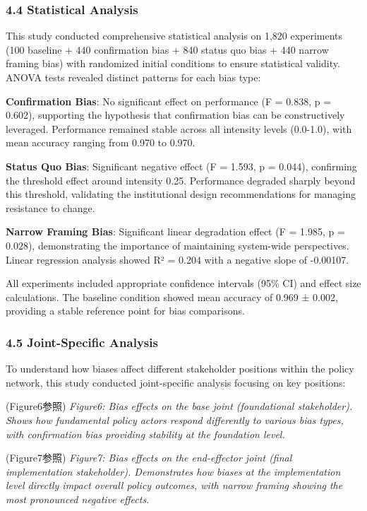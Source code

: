 \subsubsection{4.4 Statistical Analysis}\label{statistical-analysis}

This study conducted comprehensive statistical analysis on 1,820 experiments (100 baseline + 440 confirmation bias + 840 status quo bias + 440 narrow framing bias) with randomized initial conditions to ensure statistical validity. ANOVA tests revealed distinct patterns for each bias type:

\textbf{Confirmation Bias}: No significant effect on performance (F = 0.838, p = 0.602), supporting the hypothesis that confirmation bias can be constructively leveraged. Performance remained stable across all intensity levels (0.0-1.0), with mean accuracy ranging from 0.970 to 0.970.

\textbf{Status Quo Bias}: Significant negative effect (F = 1.593, p = 0.044), confirming the threshold effect around intensity 0.25. Performance degraded sharply beyond this threshold, validating the institutional design recommendations for managing resistance to change.

\textbf{Narrow Framing Bias}: Significant linear degradation effect (F = 1.985, p = 0.028), demonstrating the importance of maintaining system-wide perspectives. Linear regression analysis showed R² = 0.204 with a negative slope of -0.00107.

All experiments included appropriate confidence intervals (95\% CI) and effect size calculations. The baseline condition showed mean accuracy of 0.969 ± 0.002, providing a stable reference point for bias comparisons.

\subsubsection{4.5 Joint-Specific Analysis}\label{joint-specific-analysis-1}

To understand how biases affect different stakeholder positions within the policy network, this study conducted joint-specific analysis focusing on key positions:

(Figure6参照) \emph{Figure6: Bias effects on the base joint (foundational stakeholder). Shows how fundamental policy actors respond differently to various bias types, with confirmation bias providing stability at the foundation level.}

(Figure7参照) \emph{Figure7: Bias effects on the end-effector joint (final implementation stakeholder). Demonstrates how biases at the implementation level directly impact overall policy outcomes, with narrow framing showing the most pronounced negative effects.}

